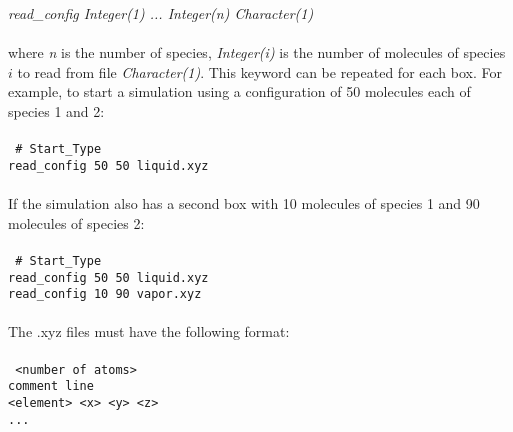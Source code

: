 \begin{itemize}
{\it read\_config Integer(1) ... Integer(n) Character(1)}\\ \\
%
where {\it n} is the number of species, {\it Integer(i)} is the number of molecules 
of species $i$ to read from file {\it Character(1)}.
This keyword can be repeated for each box. 
For example, to start a simulation using a configuration of 50 molecules each of species 1 and 2: \\ \\
%
\texttt{
\# Start\_Type \\
read\_config 50 50 liquid.xyz \\} \\
%
If the simulation also has a second box with 10 molecules of species 1 and 90 molecules of species 2: \\ \\ 
%
\texttt{
\# Start\_Type \\
read\_config 50 50 liquid.xyz \\
read\_config 10 90 vapor.xyz \\} \\
%
The .xyz files must have the following format:\\ \\
%
\texttt{
 <number of atoms>\\
 comment line\\
 <element> <x> <y> <z>\\
 ...\\
} \\
%


\end{itemize}
